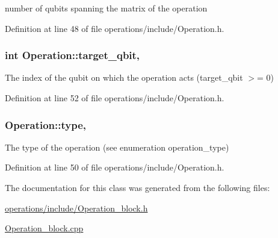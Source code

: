 number of qubits spanning the matrix of the operation 



Definition at line 48 of file operations/include/\+Operation.\+h.

\subsubsection[{\texorpdfstring{target\+\_\+qbit}{target_qbit}}]{\setlength{\rightskip}{0pt plus 5cm}int Operation\+::target\+\_\+qbit\hspace{0.3cm}{\ttfamily [protected]}, {\ttfamily [inherited]}}\hypertarget{class_operation_a3e489b72c124b494777c71b1646bb1e9}{}\label{class_operation_a3e489b72c124b494777c71b1646bb1e9}


The index of the qubit on which the operation acts (target\+\_\+qbit $>$= 0) 



Definition at line 52 of file operations/include/\+Operation.\+h.

\subsubsection[{\texorpdfstring{type}{type}}]{ Operation\+::type\hspace{0.3cm}{\ttfamily [protected]}, {\ttfamily [inherited]}}\hypertarget{class_operation_ad47c56c86d62a4c775571e1600416479}{}\label{class_operation_ad47c56c86d62a4c775571e1600416479}


The type of the operation (see enumeration operation\+\_\+type) 



Definition at line 50 of file operations/include/\+Operation.\+h.



The documentation for this class was generated from the following files\+:\begin{DoxyCompactItemize}
\item 
\hyperlink{operations_2include_2_operation__block_8h}{operations/include/\+Operation\+\_\+block.\+h}\item 
\hyperlink{_operation__block_8cpp}{Operation\+\_\+block.\+cpp}\end{DoxyCompactItemize}
